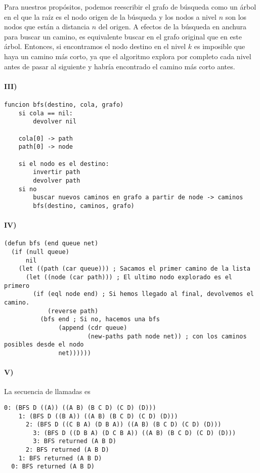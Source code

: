 \documentclass{aitemplate}
\begin{document}
Para nuestros propósitos, podemos reescribir el grafo de búsqueda como un árbol en el que la raíz es el nodo origen de la búsqueda y los nodos a nivel $n$ son los nodos que están a distancia $n$ del origen. A efectos de la búsqueda en anchura para buscar un camino, es equivalente buscar en el grafo original que en este árbol. Entonces, si encontramos el nodo destino en el nivel $k$ es imposible que haya un camino más corto, ya que el algoritmo explora por completo cada nivel antes de pasar al siguiente y habría encontrado el camino más corto antes.

\paragraph{III)}
\begin{lstlisting}
funcion bfs(destino, cola, grafo)
	si cola == nil:
		devolver nil
	
	cola[0] -> path
	path[0] -> node
	
	si el nodo es el destino:
		invertir path
		devolver path
	si no
		buscar nuevos caminos en grafo a partir de node -> caminos
		bfs(destino, caminos, grafo)	
\end{lstlisting}

\paragraph{IV)}

\begin{lstlisting}
(defun bfs (end queue net) 
  (if (null queue) 
      nil
    (let ((path (car queue))) ; Sacamos el primer camino de la lista
      (let ((node (car path))) ; El ultimo nodo explorado es el primero
        (if (eql node end) ; Si hemos llegado al final, devolvemos el camino.
            (reverse path)
          (bfs end ; Si no, hacemos una bfs
               (append (cdr queue)
                       (new-paths path node net)) ; con los caminos posibles desde el nodo
               net))))))
\end{lstlisting}

\paragraph{V)}

La secuencia de llamadas es

\begin{verbatim}
0: (BFS D ((A)) ((A B) (B C D) (C D) (D)))
    1: (BFS D ((B A)) ((A B) (B C D) (C D) (D)))
      2: (BFS D ((C B A) (D B A)) ((A B) (B C D) (C D) (D)))
        3: (BFS D ((D B A) (D C B A)) ((A B) (B C D) (C D) (D)))
        3: BFS returned (A B D)
      2: BFS returned (A B D)
    1: BFS returned (A B D)
  0: BFS returned (A B D)
\end{verbatim}
\end{document}
